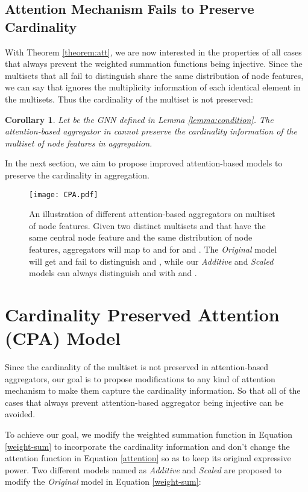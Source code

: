 \documentclass[letterpaper]{article} \usepackage{aaai20}  \usepackage{times}  \usepackage{helvet} \usepackage{courier}  \usepackage[hyphens]{url}  \usepackage{graphicx} \urlstyle{rm} \def\UrlFont{\rm}  \usepackage{graphicx}  \frenchspacing  \setlength{\pdfpagewidth}{8.5in}  \setlength{\pdfpageheight}{11in}
\theoremstyle{plain}
\newtheorem{corollary}{Corollary}
\theoremstyle{definition}
\begin{document}
\subsection{Attention Mechanism Fails to Preserve Cardinality}\label{flaw}

With Theorem \ref{theorem:att}, we are now interested in the properties of all cases that always prevent the weighted summation functions  being injective. Since the multisets that all  fail to distinguish share the same distribution of node features, we can say that  ignores the multiplicity information of each identical element in the multisets. Thus the cardinality of the multiset is not preserved:

\begin{corollary} \label{corollary:cardinality}
Let  be the GNN defined in Lemma \ref{lemma:condition}. The attention-based aggregator in  cannot preserve the cardinality information of the multiset of node features in aggregation.
\end{corollary}

In the next section, we aim to propose improved attention-based models to preserve the cardinality in aggregation.

\begin{figure}[t]
	\centering
	\texttt{[image: CPA.pdf]}
	\caption{An illustration of different attention-based aggregators on multiset of node features. Given two distinct multisets  and  that have the same central node feature  and the same distribution of node features, aggregators will map  to  and  for  and . The \textit{Original} model will get  and fail to distinguish  and , while our \textit{Additive} and \textit{Scaled} models can always distinguish  and  with  and .} \label{CPA}
\end{figure}

\section{Cardinality Preserved Attention (CPA) Model}

Since the cardinality of the multiset is not preserved in attention-based aggregators, our goal is to propose modifications to any kind of attention mechanism to make them capture the cardinality information. So that all of the cases that always prevent attention-based aggregator being injective can be avoided. 

To achieve our goal, we modify the weighted summation function in Equation \ref{weight-sum} to incorporate the cardinality information and don't change the attention function in Equation \ref{attention} so as to keep its original expressive power. Two different models named as \textit{Additive} and \textit{Scaled} are proposed to modify the \textit{Original} model in Equation \ref{weight-sum}:
\end{document}
